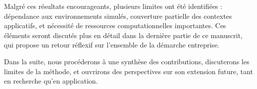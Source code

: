 Malgré ces résultats encourageants, plusieurs limites ont été identifiées : dépendance aux environnements simulés, couverture partielle des contextes applicatifs, et nécessité de ressources computationnelles importantes. Ces éléments seront discutés plus en détail dans la dernière partie de ce manuscrit, qui propose un retour réflexif sur l'ensemble de la démarche entreprise.

\vspace{1em}

\noindent
Dans la suite, nous procéderons à une synthèse des contributions, discuterons les limites de la méthode, et ouvrirons des perspectives sur son extension future, tant en recherche qu'en application.
